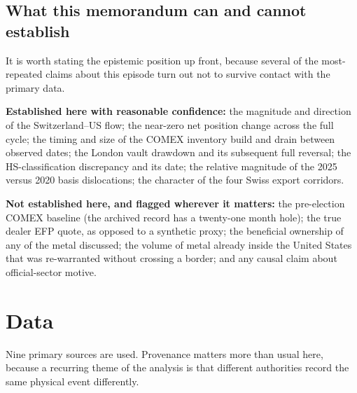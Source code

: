 \documentclass[11pt,a4paper]{article}
\begin{document}
\subsection{What this memorandum can and cannot establish}

It is worth stating the epistemic position up front, because several of the most-repeated
claims about this episode turn out not to survive contact with the primary data.

\textbf{Established here with reasonable confidence:} the magnitude and direction of the
Switzerland--US flow; the near-zero net position change across the full cycle; the timing and
size of the COMEX inventory build and drain between observed dates; the London vault drawdown
and its subsequent full reversal; the HS-classification discrepancy and its date; the
relative magnitude of the 2025 versus 2020 basis dislocations; the character of the four
Swiss export corridors.

\textbf{Not established here, and flagged wherever it matters:} the pre-election COMEX
baseline (the archived record has a twenty-one month hole); the true dealer EFP quote, as
opposed to a synthetic proxy; the beneficial ownership of any of the metal discussed;
the volume of metal already inside the United States that was re-warranted without crossing a
border; and any causal claim about official-sector motive.

\section{Data}
\label{sec:data}

Nine primary sources are used. Provenance matters more than usual here, because a recurring
theme of the analysis is that different authorities record the same physical event differently.
\end{document}
